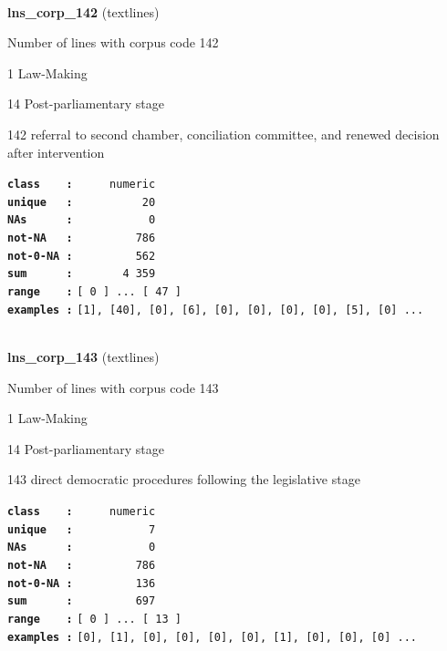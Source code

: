 \documentclass[]{article}
\begin{document}
~

\textbf{lns\_corp\_142} (textlines)

Number of lines with corpus code 142

1 Law-Making

14 Post-parliamentary stage

142 referral to second chamber, conciliation committee, and renewed
decision after intervention

\textbf{\texttt{class\ \ \ \ :}} \texttt{~~~~~numeric}\\
\textbf{\texttt{unique\ \ \ :}} \texttt{~~~~~~~~~~20}\\
\textbf{\texttt{NAs\ \ \ \ \ \ :}} \texttt{~~~~~~~~~~~0}\\
\textbf{\texttt{not-NA\ \ \ :}} \texttt{~~~~~~~~~786}\\
\textbf{\texttt{not-0-NA\ :}} \texttt{~~~~~~~~~562}\\
\textbf{\texttt{sum\ \ \ \ \ \ :}} \texttt{~~~~~~~4~359}\\
\textbf{\texttt{range\ \ \ \ :}}
\texttt{{[}\ 0\ {]}\ ...\ {[}\ 47\ {]}}\\
\textbf{\texttt{examples\ :}}
\texttt{{[}1{]},\ {[}40{]},\ {[}0{]},\ {[}6{]},\ {[}0{]},\ {[}0{]},\ {[}0{]},\ {[}0{]},\ {[}5{]},\ {[}0{]}\ ...}\\

~

\textbf{lns\_corp\_143} (textlines)

Number of lines with corpus code 143

1 Law-Making

14 Post-parliamentary stage

143 direct democratic procedures following the legislative stage

\textbf{\texttt{class\ \ \ \ :}} \texttt{~~~~~numeric}\\
\textbf{\texttt{unique\ \ \ :}} \texttt{~~~~~~~~~~~7}\\
\textbf{\texttt{NAs\ \ \ \ \ \ :}} \texttt{~~~~~~~~~~~0}\\
\textbf{\texttt{not-NA\ \ \ :}} \texttt{~~~~~~~~~786}\\
\textbf{\texttt{not-0-NA\ :}} \texttt{~~~~~~~~~136}\\
\textbf{\texttt{sum\ \ \ \ \ \ :}} \texttt{~~~~~~~~~697}\\
\textbf{\texttt{range\ \ \ \ :}}
\texttt{{[}\ 0\ {]}\ ...\ {[}\ 13\ {]}}\\
\textbf{\texttt{examples\ :}}
\texttt{{[}0{]},\ {[}1{]},\ {[}0{]},\ {[}0{]},\ {[}0{]},\ {[}0{]},\ {[}1{]},\ {[}0{]},\ {[}0{]},\ {[}0{]}\ ...}\\
\end{document}
